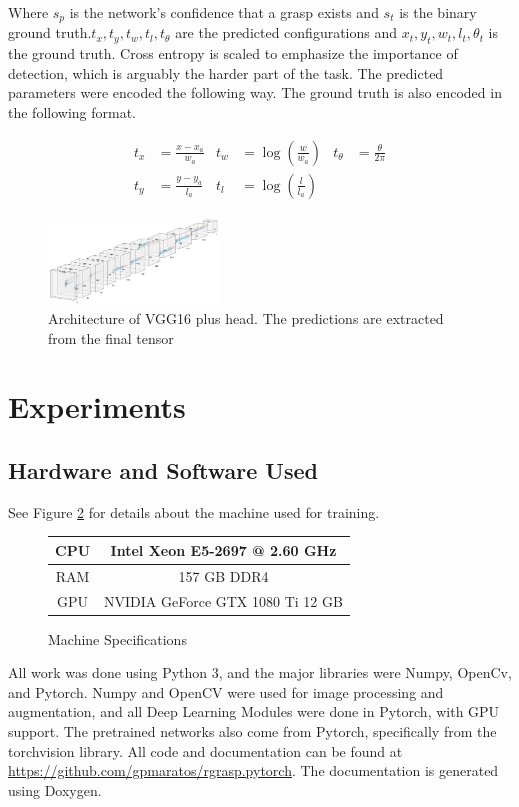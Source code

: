 \documentclass{article}
\begin{document}
Where $s_p$ is the network's confidence that a grasp exists and $s_t$ is the binary ground
truth.$t_x, t_y, t_w, t_l, t_\theta$ are the predicted configurations and
$x_t, y_t, w_t, l_t, \theta_t$ is the ground truth. Cross entropy is scaled to
emphasize the importance of detection, which is arguably the harder part of the task. The
predicted parameters were encoded the following way. The ground truth is also encoded in
the following format.

\begin{align*}
t_x&=\frac{x-x_a}{w_a} & t_w&=\log(\frac{w}{w_a}) & t_\theta&=\frac{\theta}{2\pi}\\
t_y&=\frac{y-y_a}{l_a} & t_l&=\log(\frac{l}{l_a}) & &
\end{align*}

\begin{figure}
\centering
\includegraphics[width=0.4\textwidth]{figures/nn.png}
\caption{Architecture of VGG16 plus head. The predictions are extracted from the final tensor}
\label{fig:nn}
\end{figure}

\newpage
\section{Experiments}

\subsection{Hardware and Software Used}
See Figure \ref{fig:specs} for details about the machine used for training.

\begin{figure}
\centering
\begin{tabular}{|c|c|}
\hline
CPU&Intel Xeon E5-2697 @ 2.60 GHz\\
\hline
RAM&157 GB DDR4\\
\hline
GPU&NVIDIA GeForce GTX 1080 Ti 12 GB\\
\hline
\end{tabular}
\caption{Machine Specifications}
\label{fig:specs}
\end{figure}

All work was done using Python 3, and the major libraries were
Numpy, OpenCv, and Pytorch. Numpy and OpenCV were used for image
processing and augmentation, and all Deep Learning Modules were done
in Pytorch, with GPU support. The pretrained networks also come from
Pytorch, specifically from the torchvision library.
All code and documentation can be found
at \url{https://github.com/gpmaratos/rgrasp.pytorch}. The documentation
is generated using Doxygen.
\end{document}
